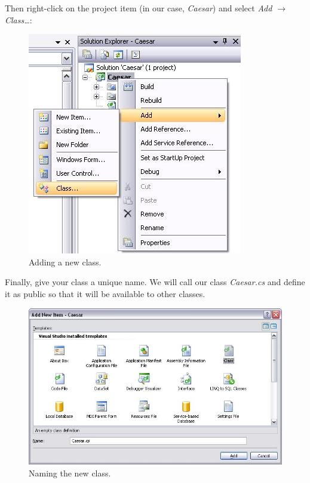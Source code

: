\noindent Then right-click on the project item (in our case, \textit{Caesar}) and select \textit{Add $\rightarrow$ Class\ldots }:

\begin{figure}[h]
	\centering
		\includegraphics{figures/add_new_class.jpg}
	\caption{Adding a new class.}
	\label{fig:add_new_class}
\end{figure}
\clearpage

\noindent Finally, give your class a unique name. We will call our class \textit{Caesar.cs} and define it as public so that it will be available to other classes.

\begin{figure}[h!]
	\centering
		\includegraphics[width=1.00\textwidth]{figures/name_new_class.jpg}
	\caption{Naming the new class.}
	\label{fig:name_new_class}
\end{figure}

